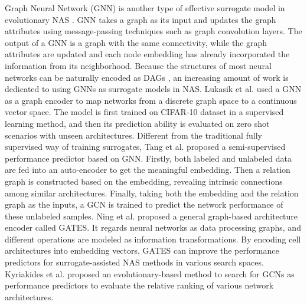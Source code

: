 \documentclass[journal]{IEEEtran}
\begin{document}
Graph Neural Network (GNN) is another type of effective surrogate model in evolutionary NAS \cite{wu2020comprehensive}. GNN takes a graph as its input and updates the graph attributes using message-passing techniques such as graph convolution layers. The output of a GNN is a graph with the same connectivity, while the graph attributes are updated and each node embedding has already incorporated the information from its neighborhood. Because the structures of most neural networks can be naturally encoded as DAGs \cite{wen2020neural}, an increasing amount of work is dedicated to using GNNs as surrogate models in NAS.
Lukasik et al. \cite{lukasik2020neural} used a GNN as a graph encoder to map networks from a discrete graph space to a continuous vector space. The model is first trained on CIFAR-10 dataset in a supervised learning method, and then its prediction ability is evaluated on zero shot scenarios with unseen architectures. Different from the traditional fully supervised way of training surrogates, Tang et al. \cite{tang2020semi} proposed a semi-supervised performance predictor based on GNN. Firstly, both labeled and unlabeled data are fed into an auto-encoder to get the meaningful embedding. Then a relation graph is constructed based on the embedding, revealing intrinsic connections among similar architectures. Finally, taking both the embedding and the relation graph as the inputs, a GCN is trained to predict the network performance of these unlabeled samples. Ning et al. \cite{ning2020generic} proposed a general graph-based architecture encoder called GATES. It regards neural networks as data processing graphs, and different operations are modeled as information transformations. By encoding cell architectures into embedding vectors, GATES can improve the performance predictors for surrogate-assisted NAS methods in various search spaces. Kyriakides et al. \cite{kyriakides2022evolving} proposed an evolutionary-based method to search for GCNs as performance predictors to evaluate the relative ranking of various network architectures.

\end{document}
